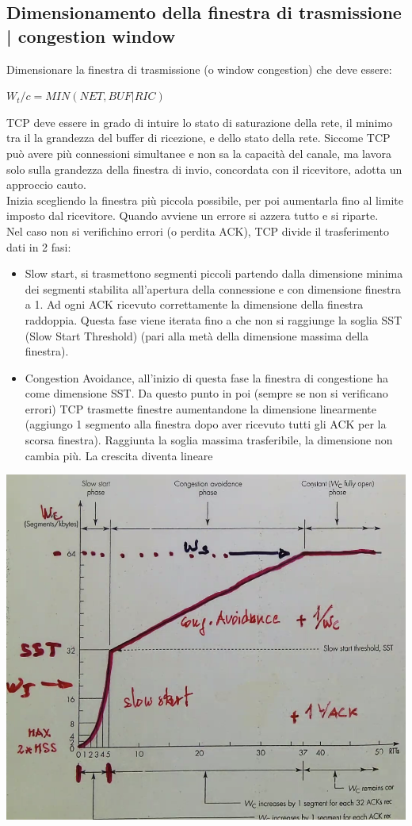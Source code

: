 \documentclass[11pt, oneside]{article}   	%
\begin{document}
\subsection*{Dimensionamento della finestra di trasmissione | congestion window}
Dimensionare la finestra di trasmissione (o window congestion) che deve essere:
\begin{center}
$W_t/c = MIN(NET,BUF | RIC)$
\end{center}
TCP deve essere in grado di intuire lo stato di saturazione della rete, il minimo tra il la grandezza del buffer di ricezione, e dello stato della rete.  Siccome TCP può avere più connessioni simultanee e non sa la capacità del canale, ma lavora solo sulla grandezza della finestra di invio, concordata con il ricevitore, adotta un approccio cauto.\\
Inizia scegliendo la finestra più piccola possibile, per poi aumentarla fino al limite imposto dal ricevitore. Quando avviene un errore si azzera tutto e si riparte.\\
Nel caso non si verifichino errori (o perdita ACK), TCP divide il trasferimento dati in 2 fasi:
\begin{itemize}
\item Slow start, si trasmettono segmenti piccoli partendo dalla dimensione minima dei segmenti stabilita all'apertura della connessione e con dimensione finestra a 1. Ad ogni ACK ricevuto correttamente la dimensione della finestra raddoppia. Questa fase viene iterata fino a che non si raggiunge la soglia SST (Slow Start Threshold) (pari alla metà della dimensione massima della finestra).
\item  Congestion Avoidance, all'inizio di questa fase la finestra di congestione ha
come dimensione SST. Da questo punto in poi (sempre se non si verificano errori) TCP trasmette finestre aumentandone la dimensione linearmente (aggiungo 1 segmento alla finestra dopo aver ricevuto tutti gli ACK per la scorsa finestra). Raggiunta la soglia massima trasferibile, la dimensione non cambia più. La crescita diventa lineare
\end{itemize}
\begin{center}
\includegraphics[scale=0.5]{t9}
\end{center}
\end{document}
